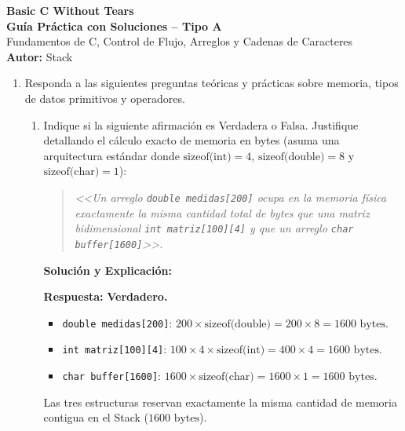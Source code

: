 \documentclass[11pt,letterpaper]{article}
\begin{document}
\begin{center}
    {\LARGE \textbf{Basic C Without Tears}} \\[0.2cm]
    {\Large \textbf{Guía Práctica con Soluciones -- Tipo A}} \\[0.12cm]
    \small Fundamentos de C, Control de Flujo, Arreglos y Cadenas de Caracteres \\[0.08cm]
    \textbf{Autor:} Stack
\end{center}
\vspace{0.2cm}

\begin{enumerate}[label=\textbf{\arabic*.}]
    \item Responda a las siguientes preguntas teóricas y prácticas sobre memoria, tipos de datos primitivos y operadores.
    
    \begin{enumerate}[label=(\alph*)]
        \item Indique si la siguiente afirmación es Verdadera o Falsa. Justifique detallando el cálculo exacto de memoria en bytes (asuma una arquitectura estándar donde $\text{sizeof(int)} = 4$, $\text{sizeof(double)} = 8$ y $\text{sizeof(char)} = 1$):
        \begin{quote}
            \textit{<<Un arreglo \texttt{double medidas[200]} ocupa en la memoria física exactamente la misma cantidad total de bytes que una matriz bidimensional \texttt{int matriz[100][4]} y que un arreglo \texttt{char buffer[1600]}>>.}
        \end{quote}

        \begin{solucionbox}
        \textbf{Solución y Explicación:}
        
        \noindent \textbf{Respuesta:} \textbf{Verdadero.}
        \begin{itemize}[noitemsep]
            \item \texttt{double medidas[200]}: $200 \times \text{sizeof(double)} = 200 \times 8 = 1600\text{ bytes}$.
            \item \texttt{int matriz[100][4]}: $100 \times 4 \times \text{sizeof(int)} = 400 \times 4 = 1600\text{ bytes}$.
            \item \texttt{char buffer[1600]}: $1600 \times \text{sizeof(char)} = 1600 \times 1 = 1600\text{ bytes}$.
        \end{itemize}
        Las tres estructuras reservan exactamente la misma cantidad de memoria contigua en el Stack ($1600\text{ bytes}$).
        \end{solucionbox}


\end{enumerate}
\end{enumerate}
\end{document}

